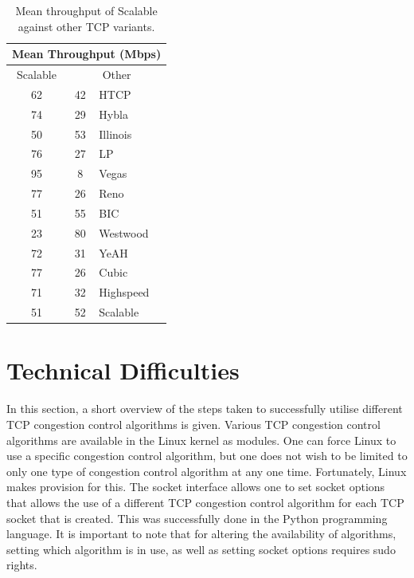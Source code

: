 \documentclass[11pt,a4paper,twocolumn]{article}
\begin{document}
\begin{table}[h!]
	\begin{center}
		\begin{tabular}{| c | c | l |}
    			\hline
			\multicolumn{3}{|c|}{Mean Throughput (Mbps)} \\
    			\hline
    			Scalable &  \multicolumn{2}{|c|}{Other}  \\
			\hline
    			62 & 42 & HTCP \\
			\hline
    			74 & 29 & Hybla \\
			\hline
    			50 & 53 & Illinois \\
			\hline
    			76 & 27 & LP \\
			\hline
    			95 & 8 & Vegas \\
			\hline
    			77 & 26 & Reno \\
			\hline
    			51 & 55 & BIC \\
			\hline
    			23 & 80 & Westwood \\
			\hline
    			72 & 31 & YeAH \\
			\hline
    			77 & 26 & Cubic \\
			\hline
    			71 & 32 & Highspeed \\
			\hline
    			51 & 52 & Scalable \\
    			\hline
    		\end{tabular}
  	\end{center}
  	\caption{Mean throughput of Scalable against other TCP variants.}
	\label{table:scalable}
\end{table}

\section{Technical Difficulties}
\label{sec:diff}
In this section, a short overview of the steps taken to successfully utilise different TCP congestion control algorithms is given.
Various TCP congestion control algorithms are available in the Linux kernel as modules.
One can force Linux to use a specific congestion control algorithm, but one does not wish to be limited to only one type of congestion control algorithm at any one time.
Fortunately, Linux makes provision for this.
The socket interface allows one to set socket options that allows the use of a different TCP congestion control algorithm for each TCP socket that is created.
This was successfully done in the Python programming language.
It is important to note that for altering the availability of algorithms, setting which algorithm is in use, as well as setting socket options requires
sudo rights.
\end{document}
